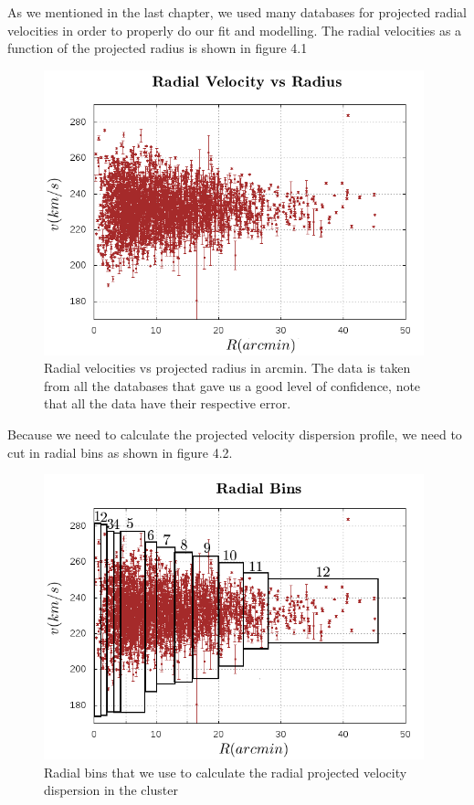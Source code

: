 As we mentioned in the last chapter, we used many databases for projected radial velocities in order to properly do our fit and modelling. The radial velocities as a function of the projected radius is shown in figure 4.1

\begin{figure}[H]
\centering
\includegraphics[width=11cm]{images/vel_vs_rad.png}
\caption[Radial velocity database]{Radial velocities vs projected radius in arcmin. The data is taken from all the databases that gave us a good level of confidence, note that all the data have their respective error.}
\end{figure}

Because we need to calculate the projected velocity dispersion profile, we need to cut in radial bins as shown in figure 4.2. 

\begin{figure}[H]
\centering
\includegraphics[width=11cm]{images/vel_vs_rad_bins.png}
\caption[Radial bins used to calculate velocity dispersions]{Radial bins that we use to calculate the radial projected velocity dispersion in the cluster}
\end{figure}

